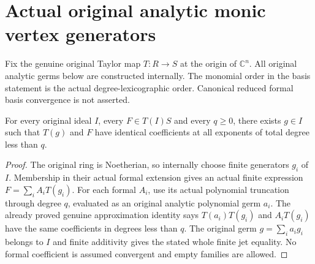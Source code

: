 \section{Actual original analytic monic vertex generators}

Fix the genuine original Taylor map $T:R\to S$ at the origin of $\mathbb C^n$.
All original analytic germs below are constructed internally. The monomial
order in the basis statement is the actual degree-lexicographic order.
Canonical reduced formal basis convergence is not asserted.

\begin{theorem}
\label{hir:actual-analytic-ideal-member-finite-jet-lift}
\leanok
For every original ideal $I$, every $F\in T(I)S$ and every $q\geq0$, there
exists $g\in I$ such that $T(g)$ and $F$ have identical coefficients at
all exponents of total degree less than $q$.
\end{theorem}
\begin{proof}
The original ring is Noetherian, so internally choose finite generators
$g_i$ of $I$. Membership in their actual formal extension gives an actual
finite expression $F=\sum_i A_iT(g_i)$. For each formal $A_i$, use its
actual polynomial truncation through degree $q$, evaluated as an original
analytic polynomial germ $a_i$. The already proved genuine approximation
identity says $T(a_i)T(g_i)$ and $A_iT(g_i)$ have the same coefficients
in degrees less than $q$. The original germ $g=\sum_i a_ig_i$ belongs
to $I$ and finite additivity gives the stated whole finite jet equality.
No formal coefficient is assumed convergent and empty families are allowed.
\end{proof}


